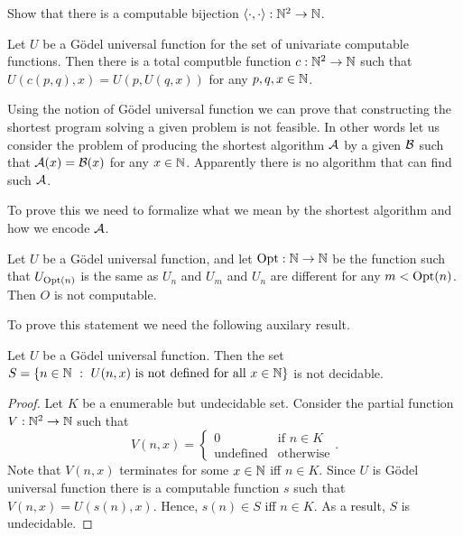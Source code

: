\begin{exercise}
  Show that there is a computable bijection $\langle {\cdot}, {\cdot} \rangle : {\mathbb{N}}^2 \to {\mathbb{N}}$.
\end{exercise}

\begin{theorem}
  Let $U$ be a G\"odel universal function for the set of univariate computable
  functions. Then there is a total computble function $c : {\mathbb{N}}^2 \to {\mathbb{N}}$ such
  that $U(c(p, q), x) = U(p, U(q, x))$ for any $p, q, x \in {\mathbb{N}}$.
\end{theorem}

Using the notion of G\"odel universal function we can prove that constructing
the shortest program solving a given problem is not feasible.
In other words let us consider the problem of producing the shortest algorithm
$\mathcal{A}$ by a given $\mathcal{B}$ such that
$\mathcal{A}(x) = \mathcal{B}(x)$ for any $x \in {\mathbb{N}}$. Apparently there is
no algorithm that can find such $\mathcal{A}$.

To prove this we need to formalize what we mean by the shortest algorithm and
how we encode $\mathcal{A}$.
\begin{theorem}
  Let $U$ be a G\"odel universal function, and let $\mathrm{Opt} : {\mathbb{N}} \to {\mathbb{N}}$ be
  the function such that $U_{\mathrm{Opt}(n)}$ is the same as $U_n$ and $U_m$ and
  $U_n$ are different for any $m < \mathrm{Opt}(n)$. Then $O$ is not computable.
\end{theorem}

To prove this statement we need the following auxilary result.
\begin{theorem}
  Let $U$ be a G\"odel universal function. 
  Then the set 
  $S = \set[U(n, x) \text{ is not defined for all } x \in \N]{n \in \N}$ is
  not decidable.
\end{theorem}
\begin{proof}
  Let $K$ be a enumerable but undecidable set.
  Consider the partial function $V : {\mathbb{N}}^2 \to {\mathbb{N}}$ such that 
  \[
    V(n, x) = 
    \begin{cases}
      0 & \text{if } n \in K \\
      \text{undefined} & \text{otherwise}
    \end{cases}.
  \]
  Note that $V(n, x)$ terminates for some $x \in {\mathbb{N}}$ iff $n \in K$. 
  Since $U$ is G\"odel universal function there is a computable function $s$
  such that $V(n, x) = U(s(n), x)$. Hence, $s(n) \in S$ iff $n \in K$.
  As a result, $S$ is undecidable.
\end{proof}
